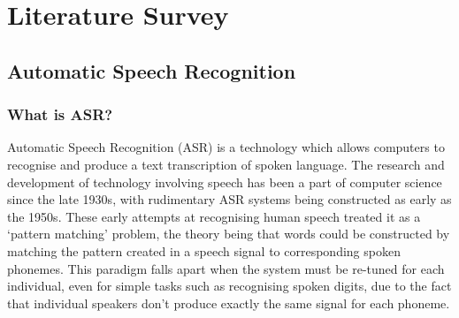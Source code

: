 \chapter{Literature Survey}\label{ch:literature-survey}

\section{Automatic Speech Recognition}\label{sec:what-is-asr}

\subsection{What is ASR?}

Automatic Speech Recognition (ASR) is a technology which allows computers to recognise and produce a text transcription of spoken language.
The research and development of technology involving speech has been a part of computer science since the late 1930s\cite{Rabiner2004Jan,vocoder}, with rudimentary ASR systems being constructed as early as the 1950s\cite{asr-52}.
These early attempts at recognising human speech treated it as a `pattern matching' problem, the theory being that words could be constructed by matching the pattern created in a speech signal to corresponding spoken phonemes\cite{Rabiner2004Jan}. 
This paradigm falls apart when the system must be re-tuned for each individual, even for simple tasks such as recognising spoken digits\cite{asr-52}, due to the fact that individual speakers don't produce exactly the same signal for each phoneme\cite{Horton2010}.


